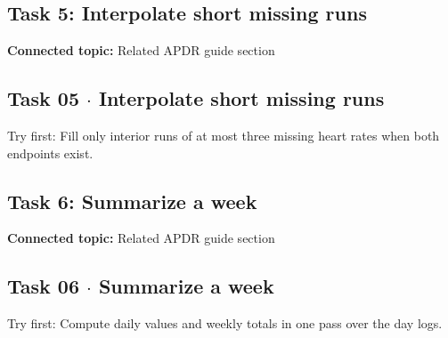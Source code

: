 \documentclass[11pt]{article}
\begin{document}
\begin{keepsection}
\section{Task 5: Interpolate short missing runs}

\textbf{Connected topic:} Related APDR guide section

\begin{keepsection}
\subsection{Task 05 \ensuremath{\cdot} Interpolate short missing runs}

Try first: Fill only interior runs of at most three missing heart rates when both endpoints exist.

\end{keepsection}
\end{keepsection}

\begin{keepsection}
\section{Task 6: Summarize a week}

\textbf{Connected topic:} Related APDR guide section

\begin{keepsection}
\subsection{Task 06 \ensuremath{\cdot} Summarize a week}

Try first: Compute daily values and weekly totals in one pass over the day logs.

\end{keepsection}
\end{keepsection}
\end{document}
